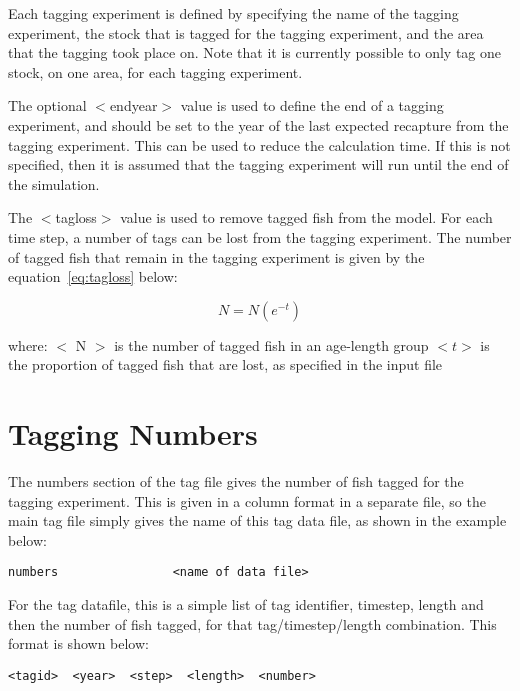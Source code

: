 \documentclass [a4paper, 10pt]{book}
\begin{document}
Each tagging experiment is defined by specifying the name of the tagging experiment, the stock that is tagged for the tagging experiment, and the area that the tagging took place on.  Note that it is currently possible to only tag one stock, on one area, for each tagging experiment.

\bigskip
The optional $<$endyear$>$ value is used to define the end of a tagging experiment, and should be set to the year of the last expected recapture from the tagging experiment.  This can be used to reduce the calculation time.  If this is not specified, then it is assumed that the tagging experiment will run until the end of the simulation.

\bigskip
The $<$tagloss$>$ value is used to remove tagged fish from the model.  For each time step, a number of tags can be lost from the tagging experiment.  The number of tagged fish that remain in the tagging experiment is given by the equation~\ref{eq:tagloss} below:

\begin{equation}\label{eq:tagloss}
N = N (e^{-t})
\end{equation}

where:\newline
$<$ N $>$ is the number of tagged fish in an age-length group\newline
$<t>$ is the proportion of tagged fish that are lost, as specified in the input file

\section{Tagging Numbers}\label{sec:tagnumbers}
The numbers section of the tag file gives the number of fish tagged for the tagging experiment.  This is given in a column format in a separate file, so the main tag file simply gives the name of this tag data file, as shown in the example below:

{\small\begin{verbatim}
numbers                <name of data file>
\end{verbatim}}

For the tag datafile, this is a simple list of tag identifier, timestep, length and then the number of fish tagged, for that tag/timestep/length combination.  This format is shown below:

{\small\begin{verbatim}
<tagid>  <year>  <step>  <length>  <number>
\end{verbatim}}
\end{document}
